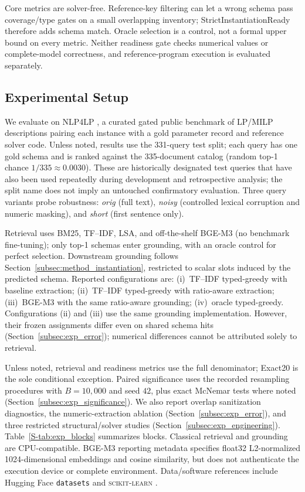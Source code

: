 \documentclass[pdflatex,sn-basic,Numbered]{sn-jnl}
\begin{document}
Core metrics are solver-free. Reference-key filtering can let a wrong schema pass coverage/type gates on a small overlapping inventory; StrictInstantiationReady therefore adds schema match. Oracle selection is a control, not a formal upper bound on every metric. Neither readiness gate checks numerical values or complete-model correctness, and reference-program execution is evaluated separately.

\subsection{Experimental Setup}
\label{subsec:exp_setup}

We evaluate on \textsc{NLP4LP} \cite{nlp4lp_dataset,ahmaditeshnizi2024optimus_icml}, a curated gated public benchmark of LP/MILP descriptions pairing each instance with a gold parameter record and reference solver code. Unless noted, results use the 331-query test split; each query has one gold schema and is ranked against the 335-document catalog (random top-1 chance $1/335 \approx 0.0030$). These are historically designated test queries that have also been used repeatedly during development and retrospective analysis; the split name does not imply an untouched confirmatory evaluation. Three query variants probe robustness: \emph{orig} (full text), \emph{noisy} (controlled lexical corruption and numeric masking), and \emph{short} (first sentence only).

Retrieval uses BM25, TF--IDF, LSA, and off-the-shelf BGE-M3 (no benchmark fine-tuning); only top-1 schemas enter grounding, with an oracle control for perfect selection. Downstream grounding follows Section~\ref{subsec:method_instantiation}, restricted to scalar slots induced by the predicted schema. Reported configurations are: (i)~TF--IDF typed-greedy with baseline extraction; (ii)~TF--IDF typed-greedy with ratio-aware extraction; (iii)~BGE-M3 with the same ratio-aware grounding; (iv)~oracle typed-greedy. Configurations (ii) and (iii) use the same grounding implementation. However, their frozen assignments differ even on shared schema hits (Section~\ref{subsec:exp_error}); numerical differences cannot be attributed solely to retrieval.

Unless noted, retrieval and readiness metrics use the full denominator; Exact20 is the sole conditional exception. Paired significance uses the recorded resampling procedures with $B=10{,}000$ and seed $42$, plus exact McNemar tests where noted (Section~\ref{subsec:exp_significance}). We also report overlap sanitization diagnostics, the numeric-extraction ablation (Section~\ref{subsec:exp_error}), and three restricted structural/solver studies (Section~\ref{subsec:exp_engineering}). Table~\ref{S-tab:exp_blocks} summarizes blocks. Classical retrieval and grounding are CPU-compatible. BGE-M3 reporting metadata specifies float32 L2-normalized 1024-dimensional embeddings and cosine similarity, but does not authenticate the execution device or complete environment. Data/software references include Hugging Face \texttt{datasets} \cite{lhoest2021datasets} and \textsc{scikit-learn} \cite{pedregosa2011sklearn}.
\end{document}
